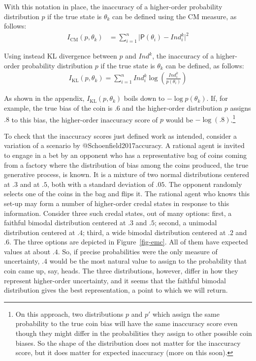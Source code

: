 \documentclass[
  letterpaper,
  DIV=11,
  numbers=noendperiod]{scrartcl}
\begin{document}
With this notation in place, the inaccuracy of a higher-order
probability distribution \(p\) if the true state is \(\theta_k\) can be
defined using the CM measure, as follows: \begin{align*}
I_{\text{CM}}(p, \theta_{k}) &= \sum_{i=1}^n \vert \mathsf{P}(\theta_i) - Ind^k_i \vert ^2 
\end{align*}

\noindent Using instead KL divergence between \(p\) and \(Ind^k\), the
inaccuracy of a higher-order probability distribution \(p\) if the true
state is \(\theta_k\) can be defined, as follows: \begin{align*}
I_{\text{KL}}(p, \theta_k)  = \sum_{i=1}^n Ind^k_i \log\left(\frac{Ind^k_i}{p(\theta_i)}\right)
\end{align*}

\noindent As shown in the appendix, \(I_{\text{KL}}(p, \theta_k)\) boils
down to \(-\log p(\theta_k)\). If, for example, the true bias of the
coin is \(.6\) and the higher-order distribution \(p\) assigns \(.8\) to
this bias, the higher-order inaccuracy score of \(p\) would be
\(-\log (.8)\).\footnote{On this approach, two distributions \(p\) and
  \(p'\) which assign the same probability to the true coin bias will
  have the same inaccuracy score even though they might differ in the
  probabilities they assign to other possible coin biases. So the shape
  of the distribution does not matter for the inaccuracy score, but it
  does matter for expected inaccuracy (more on this soon).}

To check that the inaccuracy scores just defined work as intended,
consider a variation of a scenario by @Schoenfield2017accuracy. A
rational agent is invited to engage in a bet by an opponent who has a
representative bag of coins coming from a factory where the distribution
of bias among the coins produced, the true generative process, is known.
It is a mixture of two normal distributions centered at \(.3\) and at
\(.5\), both with a standard deviation of \(.05\). The opponent randomly
selects one of the coins in the bag and flips it. The rational agent who
knows this set-up may form a number of higher-order credal states in
response to this information. Consider three such credal states, out of
many options: first, a faithful bimodal distribution centered at \(.3\)
and \(.5\); second, a unimodal distribution centered at \(.4\); third, a
wide bimodal distribution centered at \(.2\) and \(.6\). The three
options are depicted in Figure~\ref{fig-emc}. All of them have expected
values at about \(.4\). So, if precise probabilities were the only
measure of uncertainty, \(.4\) would be the most natural value to assign
to the probability that coin came up, say, heads. The three
distributions, however, differ in how they represent higher-order
uncertainty, and it seems that the faithful bimodal distribution gives
the best representation, a point to which we will return.
\end{document}

